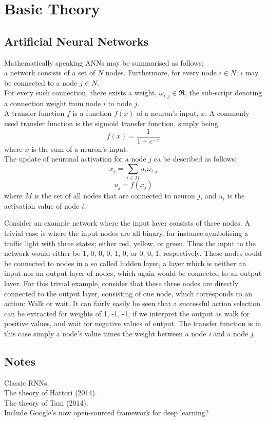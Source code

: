 
\chapter{Basic Theory}

\section{Artificial Neural Networks}
Mathematically speaking ANNs may be summarised as follows;
\\
a network consists of a set of $N$ nodes. Furthermore, for every node $i\in N$: $i$ may be connected to a node $j \in N$.
\\
For every such connection, there exists a weight, $\omega_{i,j} \in \Re$, the sub-script denoting a connection weight from node $i$ to node $j$.
\\
A transfer function $f$ is a function $f(x)$ of a neuron's input, $x$. A commonly used transfer function is the sigmoid transfer function, simply being 
\begin{equation}
    f(x) = \frac{1}{1+e^{-x}}
\end{equation}
where $x$ is the sum of a neuron's input.
\\
The update of neuronal activation for a node $j$ ca be described as follows:
\\
\begin{equation}
    x_j = \sum_{i\in M} u_i \omega_{i,j}
\end{equation}
\begin{equation}
    u_j = f(x_j)
\end{equation}
where $M$ is the set of all nodes that are connected to neuron $j$, and $u_i$ is the activation value of node $i$.

Consider an example network where the input layer consists of three nodes. A trivial case is where the input nodes are all binary, for instance symbolising a traffic light with three states; either red, yellow, or green. Thus the input to the network would either be {1, 0, 0}, {0, 1, 0}, or {0, 0, 1}, respectively. These nodes could be connected to nodes in a so called hidden layer, a layer which is neither an input nor an output layer of nodes, which again would be connected to an output layer. For this trivial example, consider that these three nodes are directly connected to the output layer, consisting of one node, which corresponds to an action: Walk or wait. It can fairly easily be seen that a successful action selection can be extracted for weights of {1, -1, -1}, if we interpret the output as walk for positive values, and wait for negative values of output. The transfer function is in this case simply a node's value times the weight between a node \textit{i} and a node \textit{j}.


\section{Notes}
Classic RNNs.
\\
The theory of Hattori (2014).
\\
The theory of Tani (2014).
\\
Include Google's now open-sourced framework for deep learning?
\\


\cleardoublepage